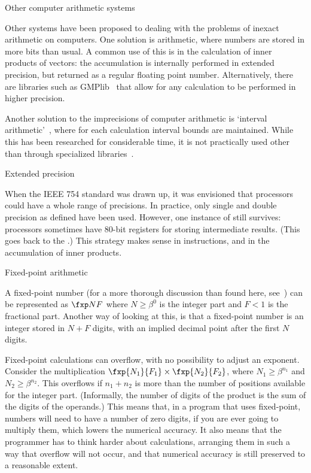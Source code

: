  {Other computer arithmetic systems}

Other systems have been proposed to dealing with the problems of
inexact arithmetic on computers. One solution is 
arithmetic, where numbers are stored in more bits than usual. A common
use of this is in the calculation of inner products of vectors: the
accumulation is internally performed in extended precision, but
returned as a regular floating point number. Alternatively, there are
libraries such as GMPlib~\cite{gmplib} that allow for any calculation
to be performed in higher precision.

Another solution to the imprecisions of computer arithmetic is `interval
arithmetic'~\cite{wikipedia:interval-arithmetic}, where for each
calculation interval bounds are maintained. While this has been
researched for considerable time, it is not practically used other
than through specialized libraries~\cite{boost:interval-arithmetic}.

 {Extended precision}
\label{sec:ext-prec}

When the IEEE 754 standard was drawn up, it was envisioned that 
processors could have a whole range of precisions. In practice,
only single and double precision as defined have been used.
However, one instance of  still survives:
processors sometimes have 80-bit registers for storing intermediate results.
(This goes back to the .)
This strategy makes sense in  instructions, 
and in the accumulation of inner products.

 {Fixed-point arithmetic}

A fixed-point number (for a more thorough discussion than found here,
see~\cite{YatesFixedPoint}) can be represented as $\fxp NF$ where
$N\geq\beta^0$ is the integer part and $F<1$ is the fractional
part. Another way of looking at this, is that a fixed-point number is
an integer stored in $N+F$ digits, with an implied decimal point after
the first $N$ digits.

Fixed-point calculations can overflow, with no possibility to adjust
an exponent. Consider the multiplication $\fxp{N_1}{F_1}\times
\fxp{N_2}{F_2}$, where $N_1\geq \beta^{n_1}$ and $N_2\geq
\beta^{n_2}$. This overflows if $n_1+n_2$ is more than the number of
positions available for the integer part. (Informally, the number of
digits of the product is the sum of the digits of the operands.)
This means that, in a program
that uses fixed-point, numbers will need to have a number of zero
digits, if you are ever going to multiply them, 
which lowers the numerical accuracy.
It also means that the programmer has to think harder about
calculations, arranging them in such a way that overflow will not
occur, and that numerical accuracy is still preserved to a reasonable
extent.


